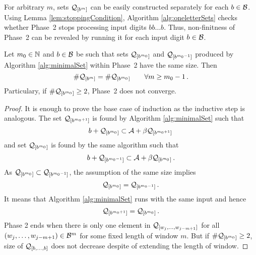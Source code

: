 For arbitrary $m$, sets $\mathcal{Q}_{[b^{m}]}$  can be easily constructed separately for each $b\in\mathcal{B}$. Using Lemma \ref{lem:stoppingCondition}, Algorithm \ref{alg:oneletterSets} checks whether Phase~2 stops processing input digits $bb\dots b$. Thus,  non-finitness of Phase~2 can be revealed by running it for each input digit $b\in\mathcal{B}$.
\begin{lem}
\label{lem:stoppingCondition}
Let $m_0 \in \mathbb{N}$ and $b\in\mathcal{B}$ be such that sets $\mathcal{Q}_{[b^{m_0}]}$ and $\mathcal{Q}_{[b^{m_0-1}]}$ produced by Algorithm \ref{alg:minimalSet} within Phase~2 have the same size. Then
$$
    \#\mathcal{Q}_{[b^{m}]} = \#\mathcal{Q}_{[b^{m_0}]} \qquad \forall m\geq m_0-1\,.
$$ 
Particulary, if $\#\mathcal{Q}_{[b^{m_0}]}\geq 2$, Phase~2 does not converge.
\end{lem}
\begin{proof}
It is enough to prove the base case of induction as the inductive step is analogous. The set $\mathcal{Q}_{[b^{m_0+1}]}$ is found by Algorithm \ref{alg:minimalSet} such that 
$$
b + \mathcal{Q}_{[b^{m_0}]} \subset \mathcal{A} + \beta \mathcal{Q}_{[b^{m_0+1}]}\,
$$
and set $\mathcal{Q}_{[b^{m_0}]}$ is found by the same algorithm such that
$$
b + \mathcal{Q}_{[b^{m_0-1}]} \subset \mathcal{A} + \beta \mathcal{Q}_{[b^{m_0}]}\,.
$$
As $\mathcal{Q}_{[b^{m_0}]} \subset \mathcal{Q}_{[b^{m_0-1}]}$, the assumption of the same size implies
$$
    \mathcal{Q}_{[b^{m_0}]} = \mathcal{Q}_{[b^{m_0-1}]}\,.
$$
It means that Algorithm \ref{alg:minimalSet} runs with the same input and hence
$$
\mathcal{Q}_{[b^{m_0+1}]}=\mathcal{Q}_{[b^{m_0}]}\,.
$$
Phase 2 ends when there is only one element in $\mathcal{Q}_{[w_j,\dots, w_{j-m+1}]}$ for all $(w_j,\dots, w_{j-m+1}) \in \mathcal{B}^m$ for some fixed length of window $m$. But if $\#\mathcal{Q}_{[b^{m_0}]}\geq 2$, size of $\mathcal{Q}_{[b,\dots,b]}$ does not decrease despite of extending the length of window.
\end{proof}

